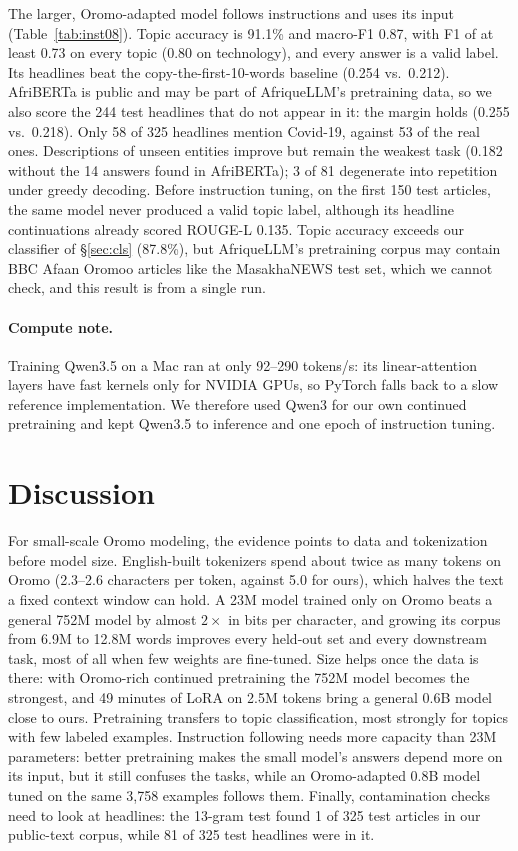 \documentclass[11pt]{article}
\begin{document}
The larger, Oromo-adapted model follows instructions and uses its input (Table~\ref{tab:inst08}). Topic accuracy is 91.1\% and macro-F1 0.87, with F1 of at least 0.73 on every topic (0.80 on technology), and every answer is a valid label. Its headlines beat the copy-the-first-10-words baseline (0.254 vs.\ 0.212). AfriBERTa is public and may be part of AfriqueLLM's pretraining data, so we also score the 244 test headlines that do not appear in it: the margin holds (0.255 vs.\ 0.218). Only 58 of 325 headlines mention Covid-19, against 53 of the real ones. Descriptions of unseen entities improve but remain the weakest task (0.182 without the 14 answers found in AfriBERTa); 3 of 81 degenerate into repetition under greedy decoding. Before instruction tuning, on the first 150 test articles, the same model never produced a valid topic label, although its headline continuations already scored ROUGE-L 0.135. Topic accuracy exceeds our classifier of \S\ref{sec:cls} (87.8\%), but AfriqueLLM's pretraining corpus may contain BBC Afaan Oromoo articles like the MasakhaNEWS test set, which we cannot check, and this result is from a single run.

\paragraph{Compute note.} Training Qwen3.5 on a Mac ran at only 92--290 tokens/s: its linear-attention layers have fast kernels only for NVIDIA GPUs, so PyTorch falls back to a slow reference implementation. We therefore used Qwen3 for our own continued pretraining and kept Qwen3.5 to inference and one epoch of instruction tuning.

\section{Discussion}

For small-scale Oromo modeling, the evidence points to data and tokenization before model size. English-built tokenizers spend about twice as many tokens on Oromo (2.3--2.6 characters per token, against 5.0 for ours), which halves the text a fixed context window can hold. A 23M model trained only on Oromo beats a general 752M model by almost $2\times$ in bits per character, and growing its corpus from 6.9M to 12.8M words improves every held-out set and every downstream task, most of all when few weights are fine-tuned. Size helps once the data is there: with Oromo-rich continued pretraining the 752M model becomes the strongest, and 49 minutes of LoRA on 2.5M tokens bring a general 0.6B model close to ours. Pretraining transfers to topic classification, most strongly for topics with few labeled examples. Instruction following needs more capacity than 23M parameters: better pretraining makes the small model's answers depend more on its input, but it still confuses the tasks, while an Oromo-adapted 0.8B model tuned on the same 3,758 examples follows them. Finally, contamination checks need to look at headlines: the 13-gram test found 1 of 325 test articles in our public-text corpus, while 81 of 325 test headlines were in it.
\end{document}
